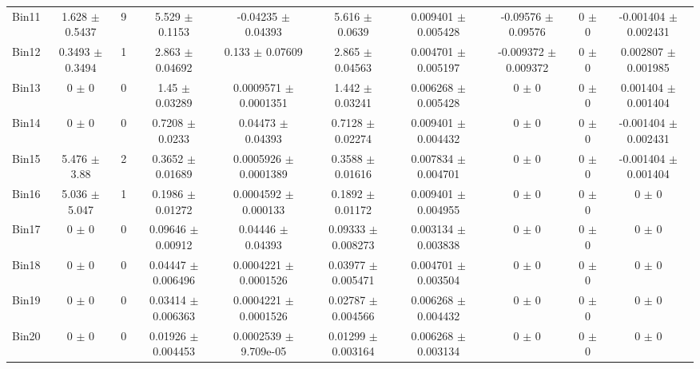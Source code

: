 \begin{tabular}{@{\extracolsep{4pt}}lccccccccc@{}}
     Bin11 & 1.628 $\pm$ 0.5437 & 9 & 5.529 $\pm$ 0.1153 & -0.04235 $\pm$ 0.04393 & 5.616 $\pm$ 0.0639 & 0.009401 $\pm$ 0.005428 & -0.09576 $\pm$ 0.09576 & 0 $\pm$ 0 & -0.001404 $\pm$ 0.002431 \\ 
     Bin12 & 0.3493 $\pm$ 0.3494 & 1 & 2.863 $\pm$ 0.04692 & 0.133 $\pm$ 0.07609 & 2.865 $\pm$ 0.04563 & 0.004701 $\pm$ 0.005197 & -0.009372 $\pm$ 0.009372 & 0 $\pm$ 0 & 0.002807 $\pm$ 0.001985 \\ 
     Bin13 & 0 $\pm$ 0 & 0 & 1.45 $\pm$ 0.03289 & 0.0009571 $\pm$ 0.0001351 & 1.442 $\pm$ 0.03241 & 0.006268 $\pm$ 0.005428 & 0 $\pm$ 0 & 0 $\pm$ 0 & 0.001404 $\pm$ 0.001404 \\ 
     Bin14 & 0 $\pm$ 0 & 0 & 0.7208 $\pm$ 0.0233 & 0.04473 $\pm$ 0.04393 & 0.7128 $\pm$ 0.02274 & 0.009401 $\pm$ 0.004432 & 0 $\pm$ 0 & 0 $\pm$ 0 & -0.001404 $\pm$ 0.002431 \\ 
     Bin15 & 5.476 $\pm$ 3.88 & 2 & 0.3652 $\pm$ 0.01689 & 0.0005926 $\pm$ 0.0001389 & 0.3588 $\pm$ 0.01616 & 0.007834 $\pm$ 0.004701 & 0 $\pm$ 0 & 0 $\pm$ 0 & -0.001404 $\pm$ 0.001404 \\ 
     Bin16 & 5.036 $\pm$ 5.047 & 1 & 0.1986 $\pm$ 0.01272 & 0.0004592 $\pm$ 0.000133 & 0.1892 $\pm$ 0.01172 & 0.009401 $\pm$ 0.004955 & 0 $\pm$ 0 & 0 $\pm$ 0 & 0 $\pm$ 0 \\ 
     Bin17 & 0 $\pm$ 0 & 0 & 0.09646 $\pm$ 0.00912 & 0.04446 $\pm$ 0.04393 & 0.09333 $\pm$ 0.008273 & 0.003134 $\pm$ 0.003838 & 0 $\pm$ 0 & 0 $\pm$ 0 & 0 $\pm$ 0 \\ 
     Bin18 & 0 $\pm$ 0 & 0 & 0.04447 $\pm$ 0.006496 & 0.0004221 $\pm$ 0.0001526 & 0.03977 $\pm$ 0.005471 & 0.004701 $\pm$ 0.003504 & 0 $\pm$ 0 & 0 $\pm$ 0 & 0 $\pm$ 0 \\ 
     Bin19 & 0 $\pm$ 0 & 0 & 0.03414 $\pm$ 0.006363 & 0.0004221 $\pm$ 0.0001526 & 0.02787 $\pm$ 0.004566 & 0.006268 $\pm$ 0.004432 & 0 $\pm$ 0 & 0 $\pm$ 0 & 0 $\pm$ 0 \\ 
     Bin20 & 0 $\pm$ 0 & 0 & 0.01926 $\pm$ 0.004453 & 0.0002539 $\pm$ 9.709e-05 & 0.01299 $\pm$ 0.003164 & 0.006268 $\pm$ 0.003134 & 0 $\pm$ 0 & 0 $\pm$ 0 & 0 $\pm$ 0 \\ 
\hline\hline
  \end{tabular}
